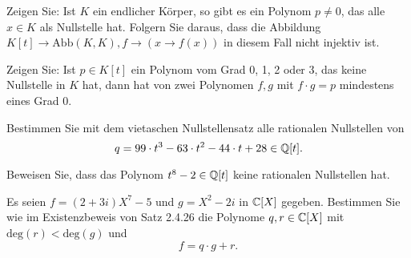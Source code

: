 \begin{Problem}
	\begin{parts}
	\item Zeigen Sie: Ist $K$ ein endlicher Körper, so gibt es ein Polynom $p \neq 0$, das alle $x \in K$ als Nullstelle hat. Folgern Sie daraus, dass die Abbildung $K[t] \to \text{Abb}(K, K), f \to (x \to f (x))$ in diesem Fall nicht injektiv ist.
	\item Zeigen Sie: Ist $p \in K[t]$ ein Polynom vom Grad 0, 1, 2 oder 3, das keine Nullstelle in $K$ hat, dann hat von zwei Polynomen $f, g$ mit $f \cdot g = p$ mindestens eines Grad 0.
	\item Bestimmen Sie mit dem vietaschen Nullstellensatz alle rationalen Nullstellen von
		\[
			q=99\cdot t^3-63\cdot t^2-44\cdot t + 28\in \mathbb{Q}[t]
		.\] 
	\item Beweisen Sie, dass das Polynom $t^8-2\in \mathbb{Q}[t]$ keine rationalen Nullstellen hat.
	\item Es seien $f=(2+3i)X^7-5$ und $g=X^2-2i$ in $\mathbb{C}[X]$ gegeben. Bestimmen Sie wie im Existenzbeweis von Satz 2.4.26 die Polynome $q,r\in \mathbb{C}[X]$ mit $\text{deg}(r)<\text{deg}(g)$ und
		\[
		f=q\cdot g+r
		.\] 
	\end{parts}
\end{Problem}
